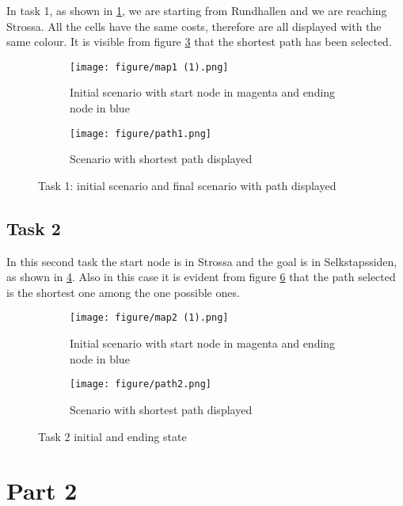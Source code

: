 \documentclass{article}
\begin{document}
In task 1, as shown in \ref{fig:map1}, we are starting from Rundhallen and we are reaching Strossa.
All the cells have the same costs, therefore are all displayed with the same colour. 
It is visible from figure \ref{fig:path1} that the shortest path has been selected.

\begin{figure}[H]
\centering
\begin{subfigure}[b]{0.4 \textwidth}
    \texttt{[image: figure/map1 (1).png]}
    \caption{Initial scenario with start node in magenta and ending node in blue}
    \label{fig:map1}
\end{subfigure}
\hfill
\begin{subfigure}{0.4\textwidth}
    \texttt{[image: figure/path1.png]}
    \caption{Scenario with shortest path displayed}
    \label{fig:path1}
\end{subfigure}
\caption{Task 1: initial scenario and final scenario with path displayed}
\end{figure}

\subsection{Task 2}

In this second task the start node is in Strossa and the goal is in Selkstapssiden, as shown in \ref{fig:map2}.
Also in this case it is evident from figure \ref{fig:path2} that the path selected is the shortest one among the one possible ones.

   \begin{figure}[H]
\centering
\begin{subfigure}[b]{0.4 \textwidth}
    \texttt{[image: figure/map2 (1).png]}
    \caption{Initial scenario with start node in magenta and ending node in blue}
    \label{fig:map2}
\end{subfigure}
\hfill
\begin{subfigure}{0.4 \textwidth}
    \texttt{[image: figure/path2.png]}
    \caption{Scenario with shortest path displayed}
    \label{fig:path2}
\end{subfigure}
\caption{Task 2 initial and ending state}
\end{figure}

\section{Part 2}
\end{document}

